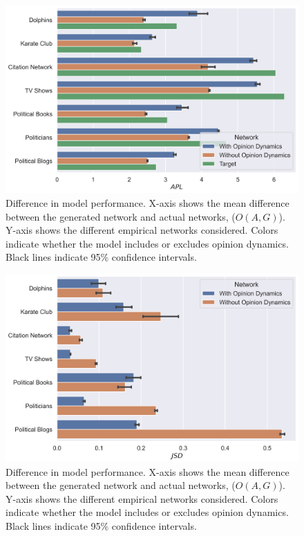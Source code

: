 \documentclass{article}
\begin{document}
\begin{figure}[H]
    \centering
    \includegraphics[width=.8\linewidth]{../plots/overall/Model_Evaluation_APL.png}
  \caption{Difference in model performance. X-axis shows the mean difference between the generated network and actual networks, ($O(A, G)$). Y-axis shows the different empirical networks considered. Colors indicate whether the model includes or excludes opinion dynamics. Black lines indicate 95\% confidence intervals.}
  \label{fig:sfig1}
\end{figure}

\begin{figure}[H]
    \centering
    \includegraphics[width=.8\linewidth]{../plots/overall/Model_Evaluation_JSD.png}
  \caption{Difference in model performance. X-axis shows the mean difference between the generated network and actual networks, ($O(A, G)$). Y-axis shows the different empirical networks considered. Colors indicate whether the model includes or excludes opinion dynamics. Black lines indicate 95\% confidence intervals.}
  \label{fig:sfig1}
\end{figure}
\end{document}
